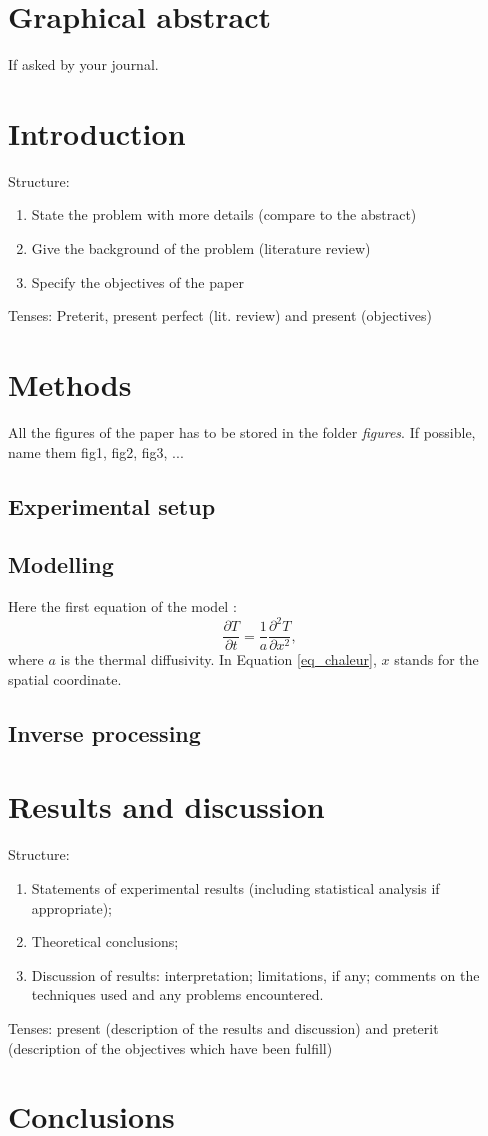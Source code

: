 \documentclass[12pt,a4paper]{article}
\begin{document}
\section*{Graphical abstract}
If asked by your journal.

\clearpage
\section{Introduction}
Structure:
\begin{enumerate}
\item	State the problem with more details (compare to the abstract)
\item Give the background of the problem (literature review)
\item	Specify the objectives of the paper
\end{enumerate}

Tenses: Preterit, present perfect (lit. review) and present (objectives)

\section{Methods}
All the figures of the paper has to be stored in the folder \textit{figures}. If possible, name them fig1, fig2, fig3, ...\\

\subsection{Experimental setup}
\subsection{Modelling}
Here the first equation of the model :
\begin{equation}
\frac{\partial T}{\partial t}=\frac{1}{a}\frac{\partial^2 T}{\partial x^2},
\label{eq_chaleur}
\end{equation}
where $a$ is the thermal diffusivity. In Equation \ref{eq_chaleur}, $x$ stands for the spatial coordinate.

\subsection{Inverse processing}

\section{Results and discussion}
Structure:
\begin{enumerate}
\item	Statements of experimental results (including statistical analysis if appropriate); 
\item	Theoretical conclusions; 
\item	Discussion of results: interpretation; limitations, if any; comments on the techniques used and any problems encountered. 
\end{enumerate}

Tenses: present (description of the results and discussion) and preterit (description of the objectives which have been fulfill)

\section{Conclusions}

\end{document}
